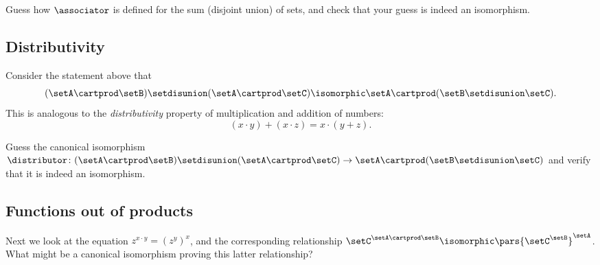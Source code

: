 \begin{exercise}\label{ex:associator-cart-prod-and-disjoint-union}
Guess how $\associator$ is defined for the sum (disjoint union) of sets, and check that your guess is indeed an isomorphism.
\end{exercise}

\begin{solution}
\end{solution}

\subsection{Distributivity}

Consider the statement above that 
\begin{equation}
(\setA \cartprod \setB) \setdisunion (\setA \cartprod \setC)  \isomorphic \setA \cartprod (\setB \setdisunion \setC).
\end{equation}
This is analogous to the \emph{distributivity} property of multiplication and addition of numbers:
\begin{equation}
(x \cdot y) + (x \cdot z)  = x \cdot (y + z).
\end{equation}

\begin{exercise}\label{ex:distributivity-isomorphism}
Guess the canonical isomorphism $\distributor \colon (\setA \cartprod \setB) \setdisunion (\setA \cartprod \setC) \to \setA \cartprod (\setB \setdisunion \setC)$ and verify that it is indeed an isomorphism. 
\end{exercise}

\begin{solution}
\end{solution}

\subsection{Functions out of products}

Next we look at the equation $z^{x \cdot y} = (z^y)^x$, and the corresponding relationship $ \setC^{\setA \cartprod \setB}  \isomorphic \pars{\setC^\setB}^\setA$. What might be a canonical isomorphism proving this latter relationship?

